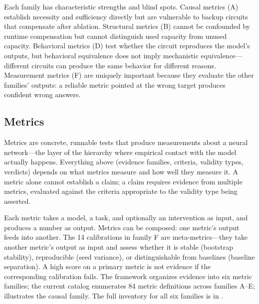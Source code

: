 \documentclass[10pt]{article}
\begin{document}
Each family has characteristic strengths and blind spots. Causal metrics (A) establish necessity and sufficiency directly but are vulnerable to backup circuits that compensate after ablation. Structural metrics (B) cannot be confounded by runtime compensation but cannot distinguish used capacity from unused capacity. Behavioral metrics (D) test whether the circuit reproduces the model's outputs, but behavioral equivalence does not imply mechanistic equivalence---different circuits can produce the same behavior for different reasons. Measurement metrics (F) are uniquely important because they evaluate the other families' outputs: a reliable metric pointed at the wrong target produces confident wrong answers.

\subsection{Metrics}
\label{sec:metrics}

Metrics are concrete, runnable tests that produce measurements about a neural network---the layer of the hierarchy where empirical contact with the model actually happens. Everything above (evidence families, criteria, validity types, verdicts) depends on what metrics measure and how well they measure it. A metric alone cannot establish a claim; a claim requires evidence from multiple metrics, evaluated against the criteria appropriate to the validity type being asserted.

Each metric takes a model, a task, and optionally an intervention as input, and produces a number as output. Metrics can be composed: one metric's output feeds into another. The 14 calibrations in family F are meta-metrics---they take another metric's output as input and assess whether it is stable (bootstrap stability), reproducible (seed variance), or distinguishable from baselines (baseline separation). A high score on a primary metric is not evidence if the corresponding calibration fails. The framework organizes evidence into six metric families; the current catalog enumerates 84 metric definitions across families A--E;  illustrates the causal family. The full inventory for all six families is in .
\end{document}
